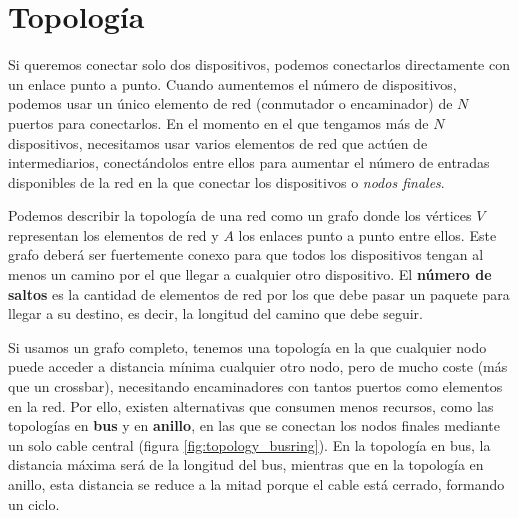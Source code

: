 \section{Topología}

Si queremos conectar solo dos dispositivos, podemos conectarlos directamente con un enlace punto a punto. Cuando aumentemos el número de dispositivos, podemos usar un único elemento de red (conmutador o encaminador) de $N$ puertos para conectarlos. En el momento en el que tengamos más de $N$ dispositivos, necesitamos usar varios elementos de red que actúen de intermediarios, conectándolos entre ellos para aumentar el número de entradas disponibles de la red en la que conectar los dispositivos o \textit{nodos finales}.

Podemos describir la topología de una red como un grafo 
donde los vértices $V$ representan los elementos de red y $A$ los enlaces punto a punto entre ellos. Este grafo deberá ser fuertemente conexo para que todos los dispositivos tengan al menos un camino por el que llegar a cualquier otro dispositivo. El \textbf{número de saltos} es la cantidad de elementos de red por los que debe pasar un paquete para llegar a su destino, es decir, la longitud del camino que debe seguir.

Si usamos un grafo completo, tenemos una topología en la que cualquier nodo puede acceder a distancia mínima cualquier otro nodo, pero de mucho coste (más que un crossbar), necesitando encaminadores con tantos puertos como elementos en la red. Por ello, existen alternativas que consumen menos recursos, como las topologías en \textbf{bus} y en \textbf{anillo}, en las que se conectan los nodos finales mediante un solo cable central (figura \ref{fig:topology_busring}). En la topología en bus, la distancia máxima será de la longitud del bus, mientras que en la topología en anillo, esta distancia se reduce a la mitad porque el cable está cerrado, formando un ciclo.

